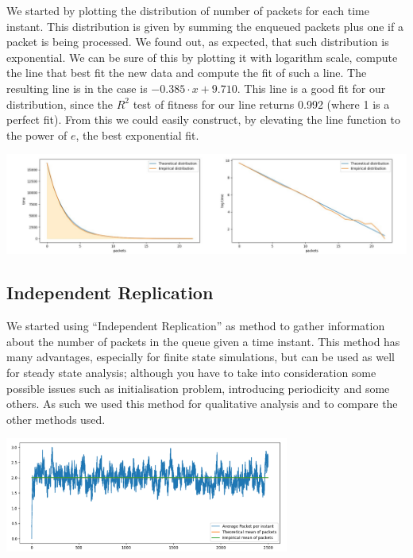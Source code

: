 \documentclass[10pt,a4paper]{article}
\begin{document}
We started by plotting the distribution of number of packets for each time instant. This distribution is given by summing the enqueued packets plus one if a packet is being processed. We found out, as expected, that such distribution is exponential. We can be sure of this by plotting it with logarithm scale, compute the line that best fit the new data and compute the fit of such a line. The resulting line is in the case  is \(-0.385 \cdot x +  9.710\). This line is a good fit for our distribution, since the \(R^2\) test of fitness for our line returns 0.992 (where 1 is a perfect fit).
From this we could easily construct, by elevating the line function to the power of \(e\), the best exponential fit.
\begin{center}
	\includegraphics[width=\textwidth]{img/time-with-fixed-packet-n.png}
	\label{fig:time-with-fixed-packet-n}
\end{center}


\subsection*{Independent Replication}

We started using ``Independent Replication'' as method to gather information about the number of packets in the queue given a time instant. This method has many advantages, especially for finite state simulations, but can be used as well for steady state analysis; although you have to take into consideration some possible issues such as initialisation problem, introducing periodicity and some others. As such we used this method for qualitative analysis and to compare the other methods used.

\begin{center}
	\includegraphics[width=0.7\textwidth]{independent-replication-with-bias.png}
	\label{fig:independent-replication-with-bias}
\end{center}
\end{document}
